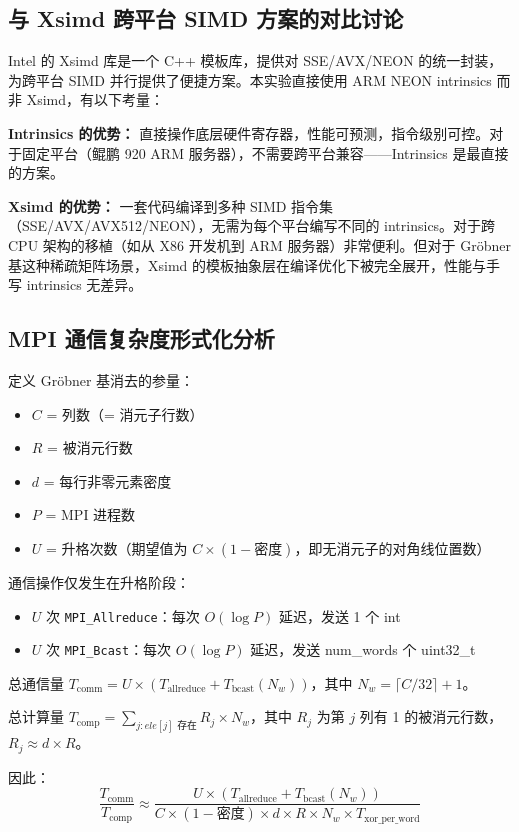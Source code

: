 \documentclass[a4paper]{article}
\begin{document}
\subsection{与 Xsimd 跨平台 SIMD 方案的对比讨论}

Intel 的 Xsimd 库是一个 C++ 模板库，提供对 SSE/AVX/NEON 的统一封装，为跨平台 SIMD 并行提供了便捷方案。本实验直接使用 ARM NEON intrinsics 而非 Xsimd，有以下考量：

\textbf{Intrinsics 的优势：} 直接操作底层硬件寄存器，性能可预测，指令级别可控。对于固定平台（鲲鹏 920 ARM 服务器），不需要跨平台兼容——Intrinsics 是最直接的方案。

\textbf{Xsimd 的优势：} 一套代码编译到多种 SIMD 指令集（SSE/AVX/AVX512/NEON），无需为每个平台编写不同的 intrinsics。对于跨 CPU 架构的移植（如从 X86 开发机到 ARM 服务器）非常便利。但对于 Gröbner 基这种稀疏矩阵场景，Xsimd 的模板抽象层在编译优化下被完全展开，性能与手写 intrinsics 无差异。

\subsection{MPI 通信复杂度形式化分析}

定义 Gröbner 基消去的参量：
\begin{itemize}
    \item $C$ = 列数（= 消元子行数）
    \item $R$ = 被消元行数
    \item $d$ = 每行非零元素密度
    \item $P$ = MPI 进程数
    \item $U$ = 升格次数（期望值为 $C \times (1 - \text{密度})$，即无消元子的对角线位置数）
\end{itemize}

通信操作仅发生在升格阶段：
\begin{itemize}
    \item $U$ 次 \texttt{MPI\_Allreduce}：每次 $O(\log P)$ 延迟，发送 1 个 int
    \item $U$ 次 \texttt{MPI\_Bcast}：每次 $O(\log P)$ 延迟，发送 num\_words 个 uint32\_t
\end{itemize}

总通信量 $T_{\text{comm}} = U \times (T_{\text{allreduce}} + T_{\text{bcast}}(N_w))$，其中 $N_w = \lceil C/32 \rceil + 1$。

总计算量 $T_{\text{comp}} = \sum_{j: ele[j] \text{ 存在}} R_j \times N_w$，其中 $R_j$ 为第 $j$ 列有 1 的被消元行数，$R_j \approx d \times R$。

因此：
\begin{equation}
\frac{T_{\text{comm}}}{T_{\text{comp}}} \approx \frac{U \times (T_{\text{allreduce}} + T_{\text{bcast}}(N_w))}{C \times (1-\text{密度}) \times d \times R \times N_w \times T_{\text{xor\_per\_word}}}
\end{equation}
\end{document}
